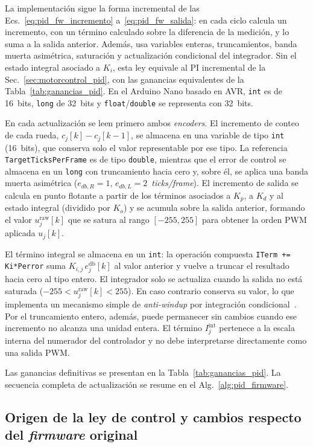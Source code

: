 \begin{appendices}
La implementación sigue la forma incremental de las Ecs.~\eqref{eq:pid_fw_incremento} a~\eqref{eq:pid_fw_salida}: en cada ciclo calcula un incremento, con un término calculado sobre la diferencia de la medición, y lo suma a la salida anterior. Además, usa variables enteras, truncamientos, banda muerta asimétrica, saturación y actualización condicional del integrador. Sin el estado integral asociado a $K_i$, esta ley equivale al PI incremental de la Sec.~\ref{sec:motorcontrol_pid}, con las ganancias equivalentes de la Tabla~\ref{tab:ganancias_pid}. En el Arduino Nano basado en AVR, \texttt{int} es de 16~bits, \texttt{long} de 32~bits y \texttt{float}/\texttt{double} se representa con 32~bits.

En cada actualización se leen primero ambos \textit{encoders}. El incremento de conteo de cada rueda, $c_j[k]-c_j[k-1]$, se almacena en una variable de tipo \texttt{int} (16~bits), que conserva solo el valor representable por ese tipo. La referencia \texttt{TargetTicksPerFrame} es de tipo \texttt{double}, mientras que el error de control se almacena en un \texttt{long} con truncamiento hacia cero y, sobre él, se aplica una banda muerta asimétrica ($e_{db,R}=1$, $e_{db,L}=2$~\textit{ticks/frame}). El incremento de salida se calcula en punto flotante a partir de los términos asociados a $K_p$, a $K_d$ y al estado integral (dividido por $K_o$) y se acumula sobre la salida anterior, formando el valor $u_j^{\mathrm{raw}}[k]$ que se satura al rango $[-255,255]$ para obtener la orden \gls{PWM} aplicada $u_j[k]$.

El término integral se almacena en un \texttt{int}: la operación compuesta \texttt{ITerm += Ki*Perror} suma $K_{i,j}\,e_j^{\mathrm{db}}[k]$ al valor anterior y vuelve a truncar el resultado hacia cero al tipo entero. El integrador solo se actualiza cuando la salida no está saturada ($-255<u_j^{\mathrm{raw}}[k]<255$). En caso contrario conserva su valor, lo que implementa un mecanismo simple de \textit{anti-windup} por integración condicional~\citep[Sec.~3.5]{astrom2009controlpid}. Por el truncamiento entero, además, puede permanecer sin cambios cuando ese incremento no alcanza una unidad entera. El término $I_j^{\mathrm{int}}$ pertenece a la escala interna del numerador del controlador y no debe interpretarse directamente como una salida PWM.

Las ganancias definitivas se presentan en la
Tabla~\ref{tab:ganancias_pid}. La secuencia completa de actualización se
resume en el Alg.~\ref{alg:pid_firmware}.

\subsection{Origen de la ley de control y cambios respecto del \texorpdfstring{\textit{firmware}}{firmware} original}
\label{anx:pid_origen}


\end{appendices}
